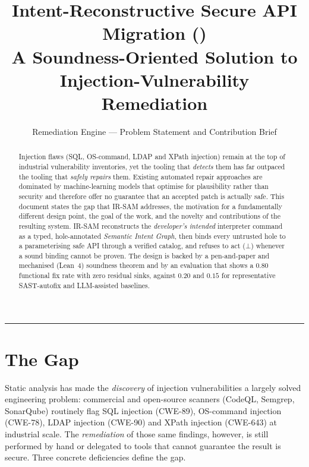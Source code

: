 \documentclass[11pt,a4paper]{article}
\title{\textbf{Intent-Reconstructive Secure API Migration (\irsam)}\\[2pt]
\large A Soundness-Oriented Solution to Injection-Vulnerability Remediation}
\author{Remediation Engine --- Problem Statement and Contribution Brief}
\date{}
\newcommand{\bottom}{\ensuremath{\bot}}
\newcommand{\irsam}{\mbox{IR\nobreakdash-SAM}}
\begin{document}
\maketitle
\vspace{-2.2em}
\begin{center}\rule{0.85\linewidth}{0.4pt}\end{center}

\begin{abstract}
\noindent
Injection flaws (SQL, OS-command, LDAP and XPath injection) remain at the
top of industrial vulnerability inventories, yet the tooling that
\emph{detects} them has far outpaced the tooling that \emph{safely
repairs} them. Existing automated repair approaches are dominated by
machine-learning models that optimise for plausibility rather than
security and therefore offer no guarantee that an accepted patch is
actually safe. This document states the gap that \irsam{} addresses, the
motivation for a fundamentally different design point, the goal of the
work, and the novelty and contributions of the resulting system. \irsam{}
reconstructs the \emph{developer's intended} interpreter command as a
typed, hole-annotated \emph{Semantic Intent Graph}, then binds every
untrusted hole to a parameterising safe API through a verified catalog,
and refuses to act (\bottom) whenever a sound binding cannot be proven.
The design is backed by a pen-and-paper and mechanised (Lean~4) soundness
theorem and by an evaluation that shows a $0.80$ functional fix rate with
zero residual sinks, against $0.20$ and $0.15$ for representative
SAST-autofix and LLM-assisted baselines.
\end{abstract}

\section{The Gap}

Static analysis has made the \emph{discovery} of injection
vulnerabilities a largely solved engineering problem: commercial and
open-source scanners (CodeQL, Semgrep, SonarQube) routinely flag
SQL injection (CWE-89), OS-command injection (CWE-78), LDAP injection
(CWE-90) and XPath injection (CWE-643) at industrial scale. The
\emph{remediation} of those same findings, however, is still performed
by hand or delegated to tools that cannot guarantee the result is
secure. Three concrete deficiencies define the gap.
\end{document}
